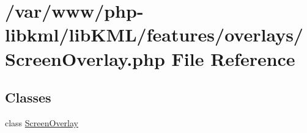 \hypertarget{ScreenOverlay_8php}{
\section{/var/www/php-\/libkml/libKML/features/overlays/ScreenOverlay.php File Reference}
\label{d4/d90/ScreenOverlay_8php}
}
\subsection*{Classes}
\begin{DoxyCompactItemize}
\item 
class \hyperlink{classScreenOverlay}{ScreenOverlay}
\end{DoxyCompactItemize}
